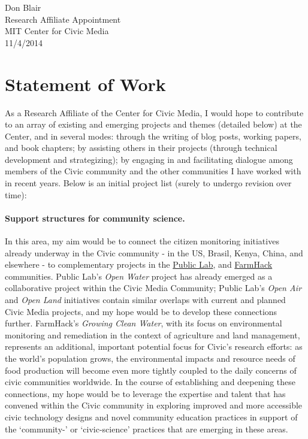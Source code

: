 \documentclass[10pt]{article}
\begin{document}
\setlength\parindent{0pt}

Don Blair\\
Research Affiliate Appointment \\
MIT Center for Civic Media \\
11/4/2014


\section*{Statement of Work}


As a Research Affiliate of the Center for Civic Media, I would hope to contribute to an array of existing and emerging projects and themes (detailed below) at the Center, and in several modes: through the writing of blog posts, working papers, and book chapters; by assisting others in their projects (through technical development and strategizing); by engaging in and facilitating dialogue among members of the Civic community and the other communities I have worked with in recent years.  Below is an initial project list  (surely to undergo revision over time):

\paragraph{Support structures for community science.} In this area, my aim would be to connect the citizen monitoring initiatives already underway in the Civic community - in the US, Brasil, Kenya, China, and elsewhere -  to complementary projects in the \href{http://publiclab.org}{Public Lab}, and \href{http://FarmHack}{FarmHack} communities.  Public Lab's \emph{Open Water} project has already emerged as a collaborative project within the Civic Media Community; Public Lab's \emph{Open Air} and \emph{Open Land} initiatives contain similar overlaps with current and planned Civic Media projects, and my hope would be to develop these connections further. FarmHack's \emph{Growing Clean Water}, with its focus on environmental monitoring and remediation in the context of agriculture and land management, represents an additional,  important potential focus for Civic's research efforts: as the world's population grows, the environmental impacts and resource needs of food production will become even more tightly coupled to the daily concerns of civic communities worldwide.  In the course of establishing and deepening these connections, my hope would be to leverage the expertise and talent that has convened within the Civic community in exploring improved and more accessible civic technology designs and novel community education practices in support of the `community-' or `civic-science' practices that are emerging in these areas.  
\end{document}
